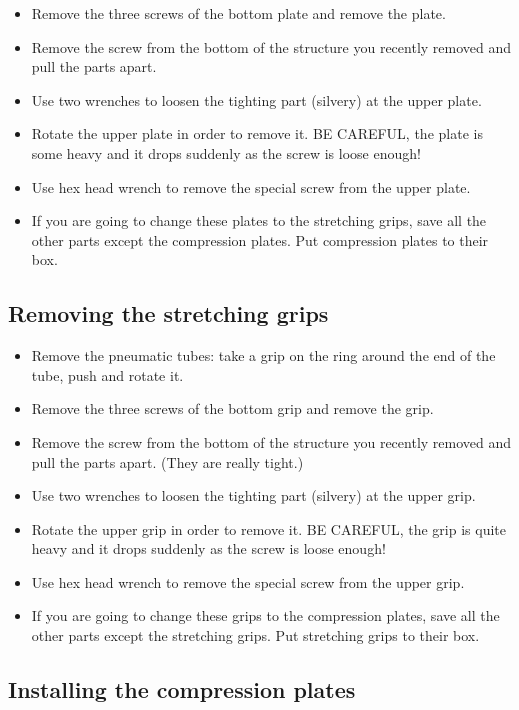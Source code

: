 \documentclass[a4paper]{article}
\begin{document}
\begin{itemize}
  \item Remove the three screws of the bottom plate and remove the plate.
  \item Remove the screw from the bottom of the structure you recently removed and pull the parts apart.
  \item Use two wrenches to loosen the tighting part (silvery) at the upper plate.
  \item Rotate the upper plate in order to remove it. BE CAREFUL, the plate is some heavy and it drops suddenly as the screw is loose enough!
  \item Use hex head wrench to remove the special screw from the upper plate.
  \item If you are going to change these plates to the stretching grips, save all the other parts except the compression plates. Put compression plates to their box.
\end{itemize}

\subsection{Removing the stretching grips}

\begin{itemize}
  \item Remove the pneumatic tubes: take a grip on the ring around the end of the tube, push and rotate it.
  \item Remove the three screws of the bottom grip and remove the grip.
  \item Remove the screw from the bottom of the structure you recently removed and pull the parts apart. (They are really tight.)
  \item Use two wrenches to loosen the tighting part (silvery) at the upper grip.
  \item Rotate the upper grip in order to remove it. BE CAREFUL, the grip is quite heavy and it drops suddenly as the screw is loose enough!
  \item Use hex head wrench to remove the special screw from the upper grip.
  \item If you are going to change these grips to the compression plates, save all the other parts except the stretching grips. Put stretching grips to their box.
\end{itemize}

\subsection{Installing the compression plates}
\end{document}
